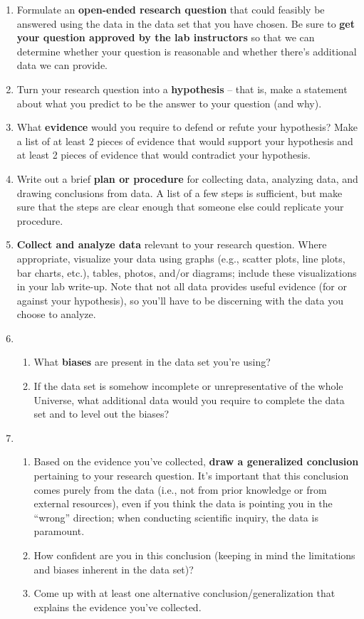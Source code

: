 \documentclass[11pt]{article}%
\begin{document}
\begin{enumerate}
    \item Formulate an \textbf{open-ended research question} that could feasibly be answered using the data in the data set that you have chosen. Be sure to \textbf{get your question approved by the lab instructors} so that we can determine whether your question is reasonable and whether there's additional data we can provide.

    \item Turn your research question into a \textbf{hypothesis} -- that is, make a statement about what you predict to be the answer to your question (and why). 

    \item What \textbf{evidence} would you require to defend or refute your hypothesis? Make a list of at least 2 pieces of evidence that would support your hypothesis and at least 2 pieces of evidence that would contradict your hypothesis.

    \item Write out a brief \textbf{plan or procedure} for collecting data, analyzing data, and drawing conclusions from data. A list of a few steps is sufficient, but make sure that the steps are clear enough that someone else could replicate your procedure.

    \item \textbf{Collect and analyze data} relevant to your research question. Where appropriate, visualize your data using graphs (e.g., scatter plots, line plots, bar charts, etc.), tables, photos, and/or diagrams; include these visualizations in your lab write-up. Note that not all data provides useful evidence (for or against your hypothesis), so you’ll have to be discerning with the data you choose to analyze.

    \item 
    \begin{enumerate}
        \item What \textbf{biases} are present in the data set you’re using? 
        \item If the data set is somehow incomplete or unrepresentative of the whole Universe, what additional data would you require to complete the data set and to level out the biases?
    \end{enumerate}

    \item 
    \begin{enumerate}
        \item Based on the evidence you’ve collected, \textbf{draw a generalized conclusion} pertaining to your research question. It’s important that this conclusion comes purely from the data (i.e., not from prior knowledge or from external resources), even if you think the data is pointing you in the “wrong” direction; when conducting scientific inquiry, the data is paramount.
        \item How confident are you in this conclusion (keeping in mind the limitations and biases inherent in the data set)?
        \item Come up with at least one alternative conclusion/generalization that explains the evidence you’ve collected.
    \end{enumerate}


\end{enumerate}
\end{document}
